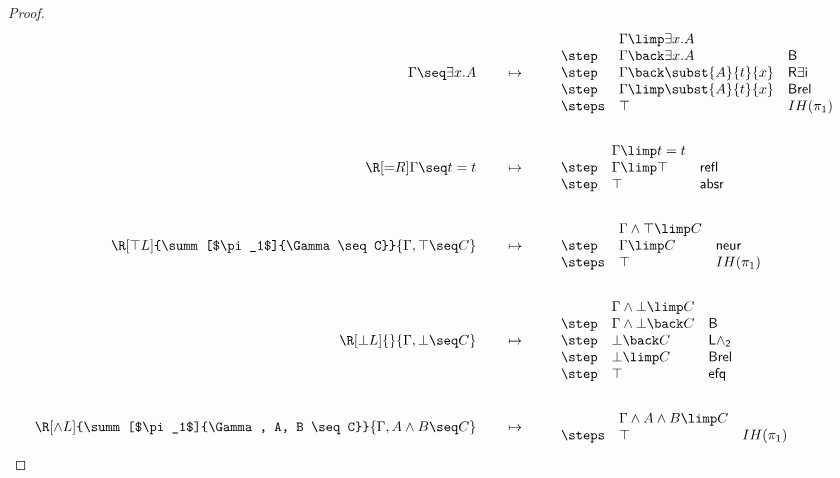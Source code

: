 \begin{proof}
\begin{align*}
      {\Gamma \seq \exists x. A}
    &\mt
    \begin{array}{lll}
            & \Gamma \limp \exists x. A & \\
      \step & \Gamma \back \exists x. A & \mathsf{B} \\
      \step & \Gamma \back \subst{A}{t}{x} & \mathsf{R\exists i} \\
      \step & \Gamma \limp \subst{A}{t}{x} & \mathsf{Brel} \\
      \steps & \top & IH(\pi_1)
    \end{array}
    \\\\
    \R[{=}R]
      {}
      {\Gamma \seq t = t}
    &\mt
    \begin{array}{lll}
            & \Gamma \limp t = t & \\
      \step & \Gamma \limp \top & \mathsf{refl} \\
      \step & \top & \mathsf{absr}
    \end{array}
    \\\\
    \R[\top L]
      {\summ[$\pi_1$]{\Gamma \seq C}}
      {\Gamma, \top \seq C}
    &\mt
    \begin{array}{lll}
            & \Gamma \land \top \limp C & \\
      \step & \Gamma \limp C & \mathsf{neur} \\
      \steps & \top & IH(\pi_1)
    \end{array}
    \\\\
    \R[\bot L]
      {}
      {\Gamma, \bot \seq C}
    &\mt
    \begin{array}{lll}
            & \Gamma \land \bot \limp C & \\
      \step & \Gamma \land \bot \back C & \mathsf{B} \\
      \step & \bot \back C & \mathsf{L\land_2} \\
      \step & \bot \limp C & \mathsf {Brel} \\
      \step & \top & \mathsf{efq}
    \end{array}
    \\\\
    \R[\land L]
      {\summ[$\pi_1$]{\Gamma, A, B \seq C}}
      {\Gamma, A \land B \seq C}
    &\mt
    \begin{array}{lll}
            & \Gamma \land A \land B \limp C & \\
      \steps & \top & IH(\pi_1)
    \end{array}

\end{align*}
\end{proof}
